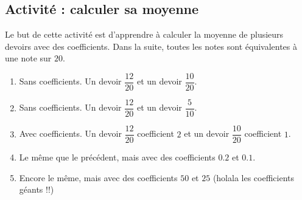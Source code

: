 
\subsection*{Activité : calculer sa moyenne}

Le but de cette activité est d'apprendre à calculer la moyenne de plusieurs devoirs avec des coefficients. Dans la suite, toutes les notes sont équivalentes à une note sur \( 20\).
\begin{enumerate}
    \item
        Sans coefficients. Un devoir \( \dfrac{ 12 }{ 20 }\) et un devoir \( \dfrac{ 10 }{ 20 }\).
    \item
        Sans coefficients. Un devoir \( \dfrac{ 12 }{ 20 }\) et un devoir \( \dfrac{ 5 }{ 10 }\).
    \item
        Avec coefficients. Un devoir \( \dfrac{ 12 }{ 20 }\) coefficient \( 2\) et un devoir \( \dfrac{ 10 }{ 20 }\) coefficient \( 1\).
    \item
        Le même que le précédent, mais avec des coefficients \( 0.2\) et \( 0.1\).
    \item
        Encore le même, mais avec des coefficients \( 50\) et \( 25\) (holala les coefficients géants !!)
\end{enumerate}
